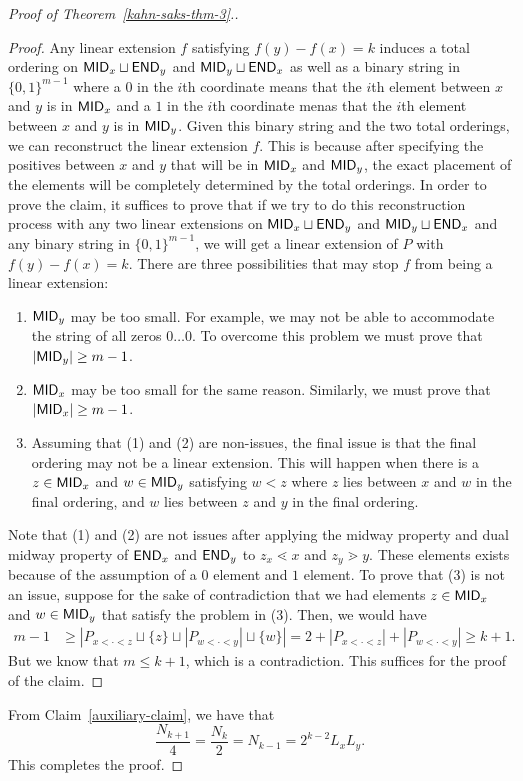 \documentclass{puthesis-UG}
\begin{document}
\begin{proof}[Proof of Theorem~\ref{kahn-saks-thm-3}.]
	\begin{proof}
		Any linear extension $f$ satisfying $f(y) - f(x) = k$ induces a total ordering on $\mathsf{MID}_x \sqcup \mathsf{END}_y$ and $\mathsf{MID}_y \sqcup \mathsf{END}_x$ as well as a binary string in $\{0, 1\}^{m-1}$ where a $0$ in the $i$th coordinate means that the $i$th element between $x$ and $y$ is in $\mathsf{MID}_x$ and a $1$ in the $i$th coordinate menas that the $i$th element between $x$ and $y$ is in $\mathsf{MID}_y$. Given this binary string and the two total orderings, we can reconstruct the linear extension $f$. This is because after specifying the positives between $x$ and $y$ that will be in $\mathsf{MID}_x$ and $\mathsf{MID}_y$, the exact placement of the elements will be completely determined by the total orderings. In order to prove the claim, it suffices to prove that if we try to do this reconstruction process with any two linear extensions on $\mathsf{MID}_x \sqcup \mathsf{END}_y$ and $\mathsf{MID}_y \sqcup \mathsf{END}_x$ and any binary string in $\{0, 1\}^{m-1}$, we will get a linear extension of $P$ with $f(y) - f(x) = k$. There are three possibilities that may stop $f$ from being a linear extension: 
		\begin{enumerate}[label = (\arabic*)]
			\item $\mathsf{MID}_y$ may be too small. For example, we may not be able to accommodate the string of all zeros $0 \ldots 0$. To overcome this problem we must prove that $|\mathsf{MID}_y| \geq m-1$. 
			\item $\mathsf{MID}_x$ may be too small for the same reason. Similarly, we must prove that $|\mathsf{MID}_x| \geq m-1$. 
			\item Assuming that (1) and (2) are non-issues, the final issue is that the final ordering may not be a linear extension. This will happen when there is a $z \in \mathsf{MID}_x$ and $w \in \mathsf{MID}_y$ satisfying $w < z$ where $z$ lies between $x$ and $w$ in the final ordering, and $w$ lies between $z$ and $y$ in the final ordering.
		\end{enumerate}
		Note that (1) and (2) are not issues after applying the midway property and dual midway property of $\mathsf{END}_x$ and $\mathsf{END}_y$ to $z_x \lessdot x$ and $z_y \gtrdot y$. These elements exists because of the assumption of a $0$ element and $1$ element. To prove that (3) is not an issue, suppose for the sake of contradiction that we had elements $z \in \mathsf{MID}_x$ and $w \in \mathsf{MID}_y$ that satisfy the problem in (3). Then, we would have 
		\begin{align*}
			m-1 & \geq \left | P_{x < \cdot < z} \sqcup \{z\} \sqcup |P_{w < \cdot < y}| \sqcup \{w\} \right | = 2 + |P_{x < \cdot < z}| + |P_{w < \cdot < y}| \geq k+1.
		\end{align*}
		But we know that $m \leq k+1$, which is a contradiction. This suffices for the proof of the claim. 
	\end{proof}
	From Claim~\ref{auxiliary-claim}, we have that 
	\[
		\frac{N_{k+1}}{4} = \frac{N_{k}}{2} = N_{k-1} = 2^{k-2} L_x L_y. 
	\]
	This completes the proof.
\end{proof}
\end{document}
